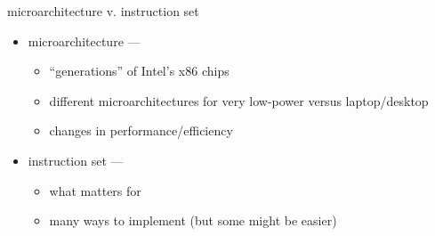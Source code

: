\begin{frame}{microarchitecture v. instruction set}
    \begin{itemize}
    \item microarchitecture --- 
        \begin{itemize}
        \item ``generations'' of Intel's x86 chips
        \item different microarchitectures for very low-power versus laptop/desktop
        \item changes in performance/efficiency
        \end{itemize}
    \item instruction set --- 
        \begin{itemize}
        \item what matters for 
        \item many ways to implement (but some might be easier)
        \end{itemize}
    \end{itemize}
\end{frame}

